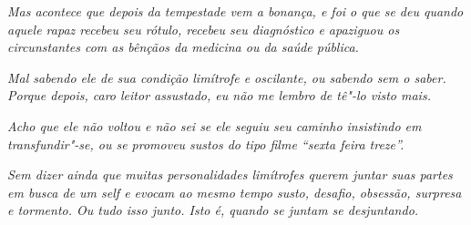 \emph{Mas acontece que depois da tempestade vem a bonança, e foi o que
se deu quando aquele rapaz recebeu seu rótulo, recebeu seu diagnóstico e
apaziguou os circunstantes com as bênçãos da medicina ou da saúde
pública.}~

\emph{Mal sabendo ele de sua condição limítrofe e oscilante, ou sabendo
sem o saber. Porque depois, caro leitor assustado, eu não me lembro de
tê"-lo visto mais.}~

\emph{Acho que ele não voltou e não sei se ele seguiu seu caminho
insistindo em transfundir"-se, ou se promoveu sustos do tipo filme
``sexta feira treze''.}~

\emph{Sem dizer ainda que muitas personalidades limítrofes querem juntar
suas partes em busca de um self e evocam ao mesmo tempo susto, desafio,
obsessão, surpresa e tormento. Ou tudo isso junto. Isto é, quando se
juntam se desjuntando.}
\endgroup
 

